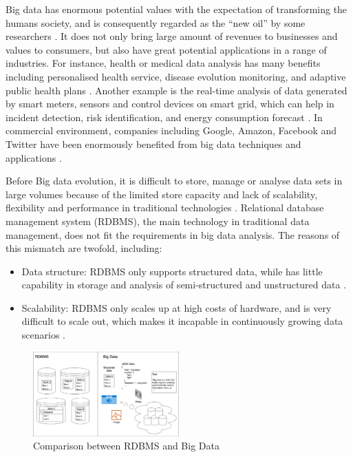 \documentclass[conference]{IEEEtran}
\let\oldincludegraphics\includegraphics
\renewcommand{\includegraphics}[1]{\oldincludegraphics[width=0.5\textwidth,keepaspectratio]{#1}}
\providecommand{\tightlist}{%
  \setlength{\itemsep}{0pt}\setlength{\parskip}{0pt}
}
\begin{document}
Big data has enormous potential values with the expectation of
transforming the humans society, and is consequently regarded as the
``new oil'' by some researchers \autocite{hu2014}. It does not only
bring large amount of revenues to businesses and values to consumers,
but also have great potential applications in a range of industries. For
instance, health or medical data analysis has many benefits including
personalised health service, disease evolution monitoring, and adaptive
public health plans \autocite{OUSSOUS2018431}. Another example is the
real-time analysis of data generated by smart meters, sensors and
control devices on smart grid, which can help in incident detection,
risk identification, and energy consumption forecast
\autocite{OUSSOUS2018431}. In commercial environment, companies
including Google, Amazon, Facebook and Twitter have been enormously
benefited from big data techniques and applications
\autocite{Hewage2018}.

Before Big data evolution, it is difficult to store, manage or analyse
data sets in large volumes because of the limited store capacity and
lack of scalability, flexibility and performance in traditional
technologies \autocite{OUSSOUS2018431}. Relational database management
system (RDBMS), the main technology in traditional data management, does
not fit the requirements in big data analysis. The reasons of this
mismatch are twofold, including:

\begin{itemize}
\tightlist
\item
  Data structure: RDBMS only supports structured data, while has little
  capability in storage and analysis of semi-structured and unstructured
  data \autocite{hu2014}.
\item
  Scalability: RDBMS only scales up at high costs of hardware, and is
  very difficult to scale out, which makes it incapable in continuously
  growing data scenarios \autocite{hu2014,SIVARAJAH2017}.
\end{itemize}

\begin{figure}
\hypertarget{fig:compare}{%
\centering
\includegraphics{img/big-data-rdbms.png}
\caption{Comparison between RDBMS and Big Data}\label{fig:compare}
}
\end{figure}
\end{document}
